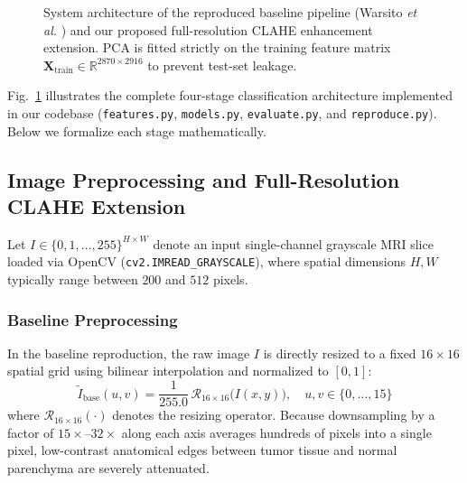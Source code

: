 \documentclass[conference]{IEEEtran}
\begin{document}
\begin{figure}[t]
\caption{System architecture of the reproduced baseline pipeline (Warsito \emph{et al.} \cite{warsito2026lightweight}) and our proposed full-resolution CLAHE enhancement extension. PCA is fitted strictly on the training feature matrix $\mathbf{X}_{\text{train}} \in \mathbb{R}^{2870 \times 2916}$ to prevent test-set leakage.}
\label{fig:pipeline}
\end{figure}

Fig.~\ref{fig:pipeline} illustrates the complete four-stage classification architecture implemented in our codebase (\texttt{features.py}, \texttt{models.py}, \texttt{evaluate.py}, and \texttt{reproduce.py}). Below we formalize each stage mathematically.

\subsection{Image Preprocessing and Full-Resolution CLAHE Extension}
Let $I \in \{0, 1, \dots, 255\}^{H \times W}$ denote an input single-channel grayscale MRI slice loaded via OpenCV (\texttt{cv2.IMREAD\_GRAYSCALE}), where spatial dimensions $H, W$ typically range between $200$ and $512$ pixels.

\subsubsection{Baseline Preprocessing}
In the baseline reproduction, the raw image $I$ is directly resized to a fixed $16 \times 16$ spatial grid using bilinear interpolation and normalized to $[0, 1]$:
\begin{equation}
    \tilde{I}_{\text{base}}(u, v) = \frac{1}{255.0} \, \mathcal{R}_{16 \times 16}\big(I(x, y)\big), \quad u, v \in \{0, \dots, 15\}
\end{equation}
where $\mathcal{R}_{16 \times 16}(\cdot)$ denotes the resizing operator. Because downsampling by a factor of $15\times\text{--}32\times$ along each axis averages hundreds of pixels into a single pixel, low-contrast anatomical edges between tumor tissue and normal parenchyma are severely attenuated.
\end{document}
